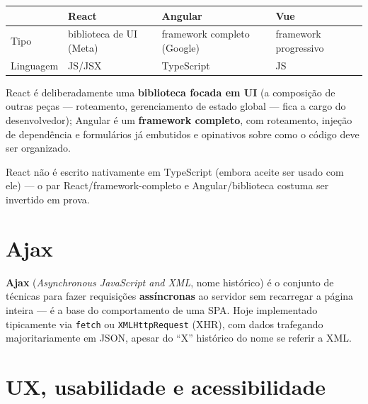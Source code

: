 \begin{conceito}
\begin{center}
\begin{tabular}{@{}p{2.2cm}p{3.4cm}p{3.4cm}p{2.6cm}@{}}
\toprule
& \textbf{React} & \textbf{Angular} & \textbf{Vue} \\
\midrule
Tipo & biblioteca de UI (Meta) & framework completo (Google) & framework
progressivo \\
Linguagem & JS/JSX & TypeScript & JS \\
\bottomrule
\end{tabular}
\end{center}
React é deliberadamente uma \textbf{biblioteca focada em UI} (a
composição de outras peças --- roteamento, gerenciamento de estado global
--- fica a cargo do desenvolvedor); Angular é um \textbf{framework
completo}, com roteamento, injeção de dependência e formulários já
embutidos e opinativos sobre como o código deve ser organizado.
\end{conceito}

\begin{cuidado}
React não é escrito nativamente em TypeScript (embora aceite ser usado
com ele) --- o par React/framework-completo e Angular/biblioteca costuma
ser invertido em prova.
\end{cuidado}

\section{Ajax}

\begin{conceito}
\textbf{Ajax} (\textit{Asynchronous JavaScript and XML}, nome histórico)
é o conjunto de técnicas para fazer requisições \textbf{assíncronas} ao
servidor sem recarregar a página inteira --- é a base do comportamento de
uma SPA. Hoje implementado tipicamente via \texttt{fetch} ou
\texttt{XMLHttpRequest} (XHR), com dados trafegando majoritariamente em
JSON, apesar do “X” histórico do nome se referir a XML.
\end{conceito}

\section{UX, usabilidade e acessibilidade}

